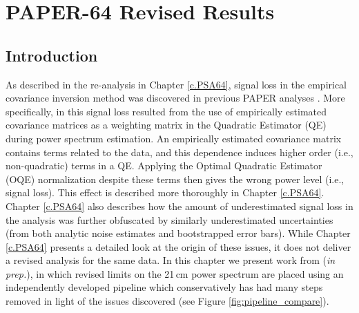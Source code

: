 \newcommand{\upperlims}{$(1440$ mK$)^{2}$, $(1850$ mK$)^{2}$, $(290$ mK$)^{2}$, $(190$ mK$)^{2}$, $(360$ mK$)^{2}$, $(290$ mK$)^{2}$ at redshifts $z=10.87,\ 9.93,\ 8.68,\ 8.37,\  8.13,$ and $7.48$, respectively}
\newcommand{\hMpci}{h\ {\rm Mpc}^{-1}}

\chapter{PAPER-64 Revised Results}
\label{c.PSA64_results}

\section{Introduction}

As described in the re-analysis in Chapter \ref{c.PSA64}, signal loss in the empirical covariance
inversion method was discovered in previous PAPER analyses \citep{ali_et_al2018}. More specifically, in  this signal loss resulted from the use of empirically estimated covariance
matrices as a weighting matrix in the Quadratic Estimator (QE)
during power spectrum estimation.
An empirically estimated covariance matrix contains
terms related to the data, and this dependence induces higher order (i.e., non-quadratic) terms in a QE.
Applying the Optimal Quadratic Estimator (OQE) normalization despite these terms then gives the
wrong power level (i.e., signal loss). This effect is described
more thoroughly in Chapter \ref{c.PSA64}.
Chapter \ref{c.PSA64} also describes how the amount of underestimated signal loss
in the  analysis was further obfuscated by similarly underestimated uncertainties (from both analytic noise estimates and bootstrapped error bars). While Chapter \ref{c.PSA64} presents a detailed look
at the origin of these issues, it does not deliver a revised analysis for the same data. In this chapter we present work from \citet{kolopanis_et_al2019} (\textit{in prep.}), in which revised limits on the 21\,cm power spectrum are placed using an independently developed pipeline which conservatively has had many steps removed in light of the issues discovered (see Figure \ref{fig:pipeline_compare}). 

